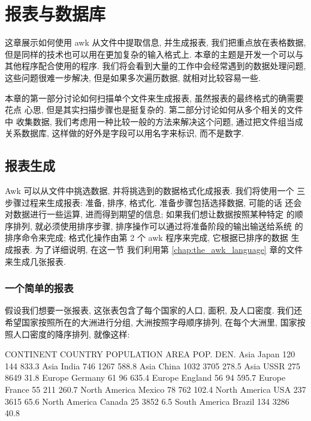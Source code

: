 \chapter{报表与数据库}
\label{reports_and_databases}

这章展示如何使用 awk 从文件中提取信息, 并生成报表, 我们把重点放在表格数据,
但是同样的技术也可以用在更加复杂的输入格式上. 本章的主题是开发一个可以与
其他程序配合使用的程序. 我们将会看到大量的工作中会经常遇到的数据处理问题,
这些问题很难一步解决, 但是如果多次遍历数据, 就相对比较容易一些.

本章的第一部分讨论如何扫描单个文件来生成报表, 虽然报表的最终格式的确需要花点
心思, 但是其实扫描步骤也是挺复杂的. 第二部分讨论如何从多个相关的文件中
收集数据, 我们考虑用一种比较一般的方法来解决这个问题, 通过把文件组当成
关系数据库, 这样做的好外是字段可以用名字来标识, 而不是数字.

\section{报表生成}
\label{sec:generating_reports}

Awk 可以从文件中挑选数据, 并将挑选到的数据格式化成报表. 我们将使用一个
三步骤过程来生成报表: 准备, 排序, 格式化. 准备步骤包括选择数据, 可能的话
还会对数据进行一些运算, 进而得到期望的信息; 如果我们想让数据按照某种特定
的顺序排列, 就必须使用排序步骤, 排序操作可以通过将准备阶段的输出输送给系统
的排序命令来完成; 格式化操作由第 2 个 awk 程序来完成, 它根据已排序的数据
生成报表. 为了详细说明, 在这一节 我们利用第 \ref{chap:the_awk_language} 
章的文件 来生成几张报表.

\subsection{一个简单的报表}
\label{subsec:a_simple_report}

假设我们想要一张报表, 这张表包含了每个国家的人口, 面积, 及人口密度. 
我们还希望国家按照所在的大洲进行分组, 大洲按照字母顺序排列, 在每个大洲里,
国家按照人口密度的降序排列, 就像这样:
\begin{shell}
    CONTINENT       COUNTRY    POPULATION    AREA    POP. DEN.
    Asia            Japan          120        144      833.3
    Asia            India          746       1267      588.8
    Asia            China         1032       3705      278.5
    Asia            USSR           275       8649       31.8
    Europe          Germany         61         96      635.4
    Europe          England         56         94      595.7
    Europe          France          55        211      260.7
    North America   Mexico          78        762      102.4
    North America   USA            237       3615       65.6
    North America   Canada          25       3852        6.5
    South America   Brazil         134       3286       40.8
\end{shell}

